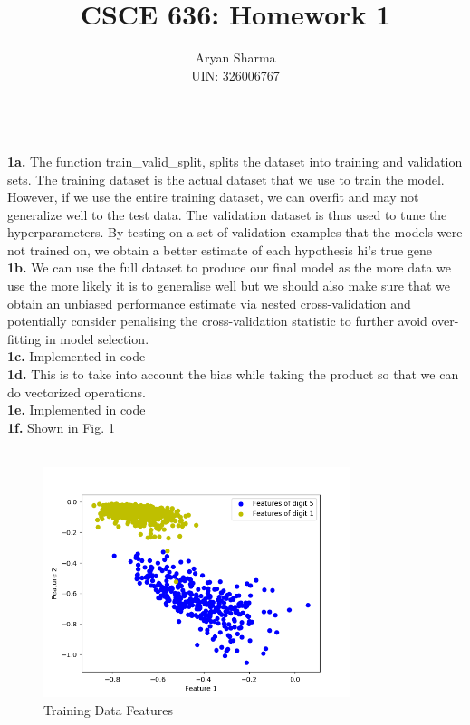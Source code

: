 \documentclass[letterpaper]{article}
\title{CSCE 636: Homework 1}
\author{Aryan Sharma\\UIN: 326006767} %
\date{} %
\begin{document}
	
\maketitle

\\

\noindent \textbf{1a.} The function train\_valid\_split, splits the dataset into training and validation sets. The training dataset is the actual dataset that we use to train the model. However, if we use the entire training dataset, we can overfit and may not generalize well to the test data. The validation dataset is thus used to tune the hyperparameters. By testing on a set of validation examples that the models were not trained on, we obtain a better estimate of each hypothesis hi’s true gene\\

\noindent \textbf{1b.} We can use the full dataset to produce our final model as the more data we use the more likely it is to generalise well but we should also make sure that we obtain an unbiased performance estimate via nested cross-validation and potentially consider penalising the cross-validation statistic to further avoid over-fitting in model selection.\\

\noindent \textbf{1c.} Implemented in code\\

\noindent \textbf{1d.} This is to take into account the bias while taking the product so that we can do vectorized operations.\\

\noindent \textbf{1e.} Implemented in code\\

\noindent \textbf{1f.} Shown in Fig. 1\\\\

 \begin{figure}
 	\centering
	\includegraphics[width=0.8\textwidth]{train_features_img0.png}
	\caption{\label{fig:data}Training Data Features}
\end{figure}
\end{document}

